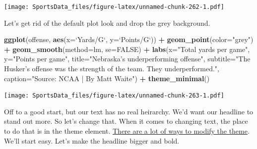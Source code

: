 \documentclass[]{book}
\newenvironment{Shaded}{\begin{snugshade}}{\end{snugshade}}
\newcommand{\DataTypeTok}[1]{\textcolor[rgb]{0.13,0.29,0.53}{#1}}
\newcommand{\KeywordTok}[1]{\textcolor[rgb]{0.13,0.29,0.53}{\textbf{#1}}}
\newcommand{\NormalTok}[1]{#1}
\newcommand{\OperatorTok}[1]{\textcolor[rgb]{0.81,0.36,0.00}{\textbf{#1}}}
\newcommand{\OtherTok}[1]{\textcolor[rgb]{0.56,0.35,0.01}{#1}}
\newcommand{\StringTok}[1]{\textcolor[rgb]{0.31,0.60,0.02}{#1}}
\begin{document}
\texttt{[image: SportsData\_files/figure-latex/unnamed-chunk-262-1.pdf]}

Let's get rid of the default plot look and drop the grey background.

\begin{Shaded}
\begin{Highlighting}[]
\KeywordTok{ggplot}\NormalTok{(offense, }\KeywordTok{aes}\NormalTok{(}\DataTypeTok{x=}\StringTok{`}\DataTypeTok{Yards/G}\StringTok{`}\NormalTok{, }\DataTypeTok{y=}\StringTok{`}\DataTypeTok{Points/G}\StringTok{`}\NormalTok{)) }\OperatorTok{+}\StringTok{ }
\StringTok{  }\KeywordTok{geom_point}\NormalTok{(}\DataTypeTok{color=}\StringTok{"grey"}\NormalTok{) }\OperatorTok{+}\StringTok{ }\KeywordTok{geom_smooth}\NormalTok{(}\DataTypeTok{method=}\NormalTok{lm, }\DataTypeTok{se=}\OtherTok{FALSE}\NormalTok{) }\OperatorTok{+}\StringTok{ }
\StringTok{  }\KeywordTok{labs}\NormalTok{(}\DataTypeTok{x=}\StringTok{"Total yards per game"}\NormalTok{, }\DataTypeTok{y=}\StringTok{"Points per game"}\NormalTok{, }\DataTypeTok{title=}\StringTok{"Nebraska's underperforming offense"}\NormalTok{, }\DataTypeTok{subtitle=}\StringTok{"The Husker's offense was the strength of the team. They underperformed."}\NormalTok{, }\DataTypeTok{caption=}\StringTok{"Source: NCAA | By Matt Waite"}\NormalTok{) }\OperatorTok{+}\StringTok{ }
\StringTok{  }\KeywordTok{theme_minimal}\NormalTok{()}
\end{Highlighting}
\end{Shaded}

\texttt{[image: SportsData\_files/figure-latex/unnamed-chunk-263-1.pdf]}

Off to a good start, but our text has no real heirarchy. We'd want our headline to stand out more. So let's change that. When it comes to changing text, the place to do that is in the theme element. \href{http://ggplot2.tidyverse.org/reference/theme.html}{There are a lot of ways to modify the theme}. We'll start easy. Let's make the headline bigger and bold.
\end{document}
